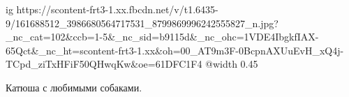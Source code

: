  
 
 
 
 

\ifcmt
  ig https://scontent-frt3-1.xx.fbcdn.net/v/t1.6435-9/161688512_3986680564717531_8799869996242555827_n.jpg?_nc_cat=102&ccb=1-5&_nc_sid=b9115d&_nc_ohc=1VDE4IbgkfIAX-65Qct&_nc_ht=scontent-frt3-1.xx&oh=00_AT9m3F-0BcpnAXUuEvH_xQ4j-TCpd_ziTxHFiF50QHwqKw&oe=61DFC1F4
  @width 0.45
\fi

Катюша с любимыми собаками.
